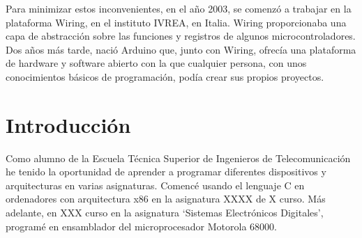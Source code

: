 Para minimizar estos inconvenientes, en el año 2003, se comenzó a trabajar en la plataforma Wiring,  en el instituto IVREA, en Italia. Wiring proporcionaba una capa de abstracción sobre las funciones y registros de algunos microcontroladores. Dos años más tarde, nació Arduino que, junto con Wiring, ofrecía una plataforma de hardware y software abierto con la que cualquier persona, con unos conocimientos básicos de programación, podía crear sus propios proyectos.


\section{Introducción}
Como alumno de la Escuela Técnica Superior de Ingenieros de Telecomunicación he tenido la oportunidad de aprender a programar diferentes dispositivos y arquitecturas en varias asignaturas. Comencé usando el lenguaje C en ordenadores con arquitectura x86 en la asignatura XXXX de X curso.  Más adelante, en XXX curso en la asignatura `Sistemas Electrónicos Digitales', programé en ensamblador del microprocesador Motorola 68000.

